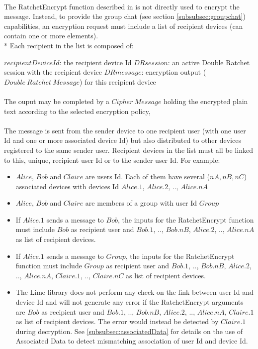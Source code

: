 \documentclass[a4paper,11pt]{article}
\begin{document}
      \paragraph{}The RatchetEncrypt function described in \cite[section 3.4]{doubleRatchet} is not directly used to encrypt the message. Instead, to provide the group chat (see section \ref{subsubsec:groupchat}) capabilities, an encryption request must include a list of recipient devices (can contain one or more elements).\\*
      Each recipient in the list is composed of:
        \begin{algorithmic}
          \State $recipientDeviceId$: the recipient device Id
          \State $DRsession$: an active Double Ratchet session with the recipient device
          \State $DRmessage$: encryption output ($Double\ Ratchet\ Message$) for this recipient device
        \end{algorithmic}
      \paragraph{}The ouput may be completed by a $Cipher\ Message$ holding the encrypted plain text according to the selected encryption policy,
      \paragraph{}The message is sent from the sender device to one recipient user (with one user Id and one or more associated device Id) but also distributed to other devices registered to the same sender user. Recipient devices in the list must all be linked to this, unique, recipient user Id or to the sender user Id. For example:
      \begin{itemize}
        \item $Alice$, $Bob$ and $Claire$ are users Id. Each of them have several ($nA, nB, nC$) associated devices with devices Id $Alice.1$, $Alice.2$, .., $Alice.nA$
        \item $Alice$, $Bob$ and $Claire$ are members of a group with user Id $Group$
        \item If $Alice.1$ sends a message to $Bob$, the inputs for the RatchetEncrypt function must include $Bob$ as recipient user and $Bob.1$, .., $Bob.nB$, $Alice.2$, .., $Alice.nA$ as list of recipient devices.
        \item If $Alice.1$ sends a message to $Group$, the inputs for the RatchetEncrypt function must include $Group$ as recipient user and $Bob.1$, .., $Bob.nB$, $Alice.2$, .., $Alice.nA$, $Claire.1$, .., $Claire.nC$ as list of recipient devices.
        \item The Lime library does not perform any check on the link between user Id and device Id and will not generate any error if the RatchetEncrypt arguments are $Bob$ as recipient user and $Bob.1$, .., $Bob.nB$, $Alice.2$, .., $Alice.nA$, $Claire.1$ as list of recipient devices. The error would instead be detected by $Claire.1$ during decryption. See \ref{subsubsec:associatedData} for details on the use of Associated Data to detect mismatching association of user Id and device Id.
        
      \end{itemize}
\end{document}
